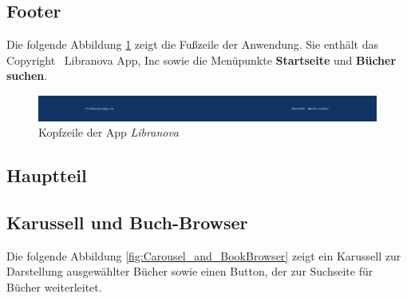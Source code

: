 \subsection{Footer}
Die folgende Abbildung \ref{fig:footer} zeigt die Fußzeile der Anwendung. Sie enthält das Copyright \textcopyright\ Libranova App, Inc sowie die Menüpunkte \textbf{Startseite} und \textbf{Bücher suchen}.

\begin{figure}[H]
	\centering
	\includegraphics[width=1.0\textwidth]{images/UI-screenshots/Footer.png}%
	\caption{ Kopfzeile der App \textit{Libranova}}
	\label{fig:footer}%
\end{figure}

\subsection{Hauptteil}

\subsection*{Karussell und Buch-Browser}

Die folgende Abbildung  \ref{fig:Carousel_and_BookBrowser} zeigt ein Karussell zur Darstellung ausgewählter Bücher sowie einen Button, der zur Suchseite für Bücher weiterleitet.

